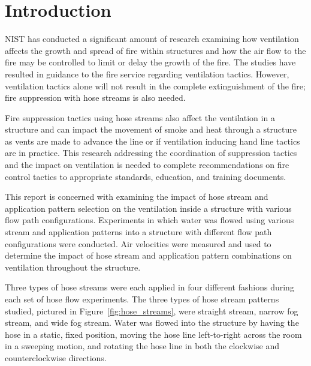 \documentclass[12pt,oneside]{book}
\begin{document}
\mainmatter

\chapter{Introduction}
\label{chap:Introduction}
NIST has conducted a significant amount of research examining how ventilation affects the growth and spread of fire within structures and how the air flow to the fire may be controlled to limit or delay the growth of the fire. The studies have resulted in guidance to the fire service regarding ventilation tactics. However, ventilation tactics alone will not result in the complete extinguishment of the fire; fire suppression with hose streams is also needed.

Fire suppression tactics using hose streams also affect the ventilation in a structure and can impact the movement of smoke and heat through a structure as vents are made to advance the line or if ventilation inducing hand line tactics are in practice. This research addressing the coordination of suppression tactics and the impact on ventilation is needed to complete recommendations on fire control tactics to appropriate standards, education, and training documents.

This report is concerned with examining the impact of hose stream and application pattern selection on the ventilation inside a structure with various flow path configurations. Experiments in which water was flowed using various stream and application patterns into a structure with different flow path configurations were conducted. Air velocities were measured and used to determine the impact of hose stream and application pattern combinations on ventilation throughout the structure. 

Three types of hose streams were each applied in four different fashions during each set of hose flow experiments. The three types of hose stream patterns studied, pictured in Figure~\ref{fig:hose_streams}, were straight stream, narrow fog stream, and wide fog stream. Water was flowed into the structure by having the hose in a static, fixed position, moving the hose line left-to-right across the room in a sweeping motion, and rotating the hose line in both the clockwise and counterclockwise directions.
\end{document}
